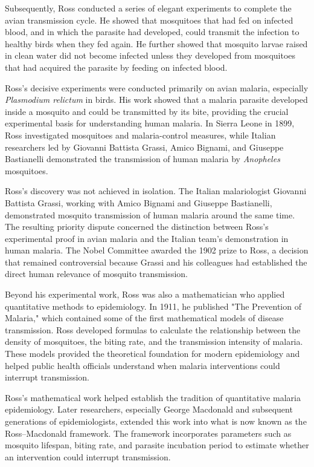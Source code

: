 Subsequently, Ross conducted a series of elegant experiments to complete the avian transmission cycle. He showed that mosquitoes that had fed on infected blood, and in which the parasite had developed, could transmit the infection to healthy birds when they fed again. He further showed that mosquito larvae raised in clean water did not become infected unless they developed from mosquitoes that had acquired the parasite by feeding on infected blood.

Ross's decisive experiments were conducted primarily on avian malaria, especially \emph{Plasmodium relictum} in birds. His work showed that a malaria parasite developed inside a mosquito and could be transmitted by its bite, providing the crucial experimental basis for understanding human malaria. In Sierra Leone in 1899, Ross investigated mosquitoes and malaria-control measures, while Italian researchers led by Giovanni Battista Grassi, Amico Bignami, and Giuseppe Bastianelli demonstrated the transmission of human malaria by \emph{Anopheles} mosquitoes.\cite{malaria-history}

Ross's discovery was not achieved in isolation. The Italian malariologist Giovanni Battista Grassi, working with Amico Bignami and Giuseppe Bastianelli, demonstrated mosquito transmission of human malaria around the same time. The resulting priority dispute concerned the distinction between Ross's experimental proof in avian malaria and the Italian team's demonstration in human malaria. The Nobel Committee awarded the 1902 prize to Ross, a decision that remained controversial because Grassi and his colleagues had established the direct human relevance of mosquito transmission.\cite{malaria-history}

Beyond his experimental work, Ross was also a mathematician who applied quantitative methods to epidemiology. In 1911, he published "The Prevention of Malaria," which contained some of the first mathematical models of disease transmission. Ross developed formulas to calculate the relationship between the density of mosquitoes, the biting rate, and the transmission intensity of malaria. These models provided the theoretical foundation for modern epidemiology and helped public health officials understand when malaria interventions could interrupt transmission.

Ross's mathematical work helped establish the tradition of quantitative malaria epidemiology. Later researchers, especially George Macdonald and subsequent generations of epidemiologists, extended this work into what is now known as the Ross--Macdonald framework. The framework incorporates parameters such as mosquito lifespan, biting rate, and parasite incubation period to estimate whether an intervention could interrupt transmission.

